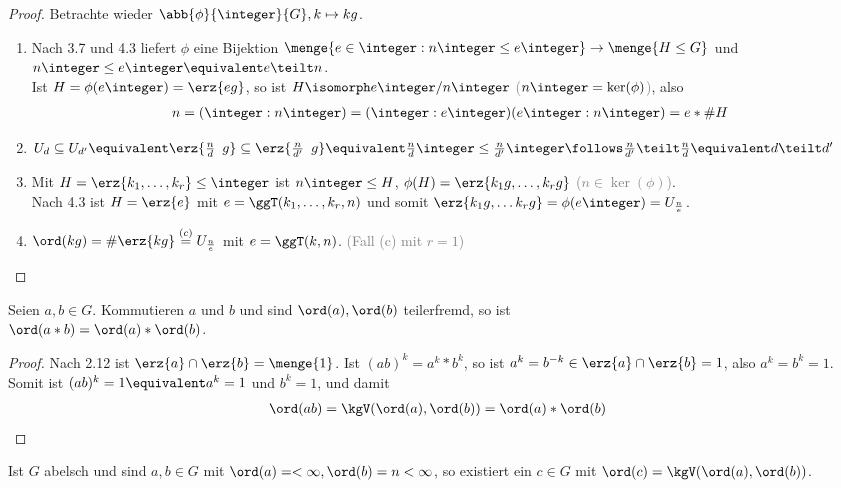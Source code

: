 \begin{proof}
	Betrachte wieder $\abb{\phi}{\integer}{G}, k \mapsto kg$.
	\begin{enumerate}
		\item Nach 3.7 und 4.3 liefert $\phi$ eine Bijektion $\menge{e \in \integer : n\integer \leq e\integer} \to \menge{H \leq G}$ und \\
		$n\integer \leq e\integer \equivalent e \teilt n$. \\
		Ist $H = \phi(e\integer) = \erz{eg}$, so ist $H \isomorph e\integer / n\integer$ \textcolor{gray}{($n\integer = \ker(\phi)$)}, also
		\begin{align*}
			n = (\integer : n \integer) = (\integer : e\integer) (e\integer : n \integer) = e * \# H
		\end{align*}
		\item $U_d \subseteq U_{d'} \equivalent \erz{\frac{n}{d} \enspace g} \subseteq \erz{\frac{n}{d'} \enspace g} \equivalent \frac{n}{d} \integer \leq \frac{n}{d'} \integer \follows \frac{n}{d'} \teilt \frac{n}{d} \equivalent d \teilt d'$
		\item Mit $H = \erz{k_1 , \dots , k_r} \leq \integer$ ist $n\integer \leq H$, $\phi(H) = \erz{k_1 g , \dots , k_r g}$ \textcolor{gray}{($n \in \ker(\phi)$)}. \\
		Nach 4.3 ist $H = \erz{e}$ mit $e = \ggT(k_1 , \dots , k_r , n)$ und somit $\erz{k_1 g , \dots k_r g} = \phi(e\integer) = U_{\frac{n}{e}}$.
		\item $\ord(kg) = \# \erz{kg} \overset{(c)}{=} U_{\frac{n}{e}}$ mit $e = \ggT(k,n)$. \textcolor{gray}{(Fall (c) mit $r=1$)}
	\end{enumerate}
\end{proof}
%
\begin{lemma}
	Seien $a,b \in G$. Kommutieren $a$ und $b$ und sind $\ord(a), \ord(b)$ teilerfremd, so ist \\
	$\ord(a*b) = \ord(a) * \ord(b)$.
\end{lemma}
\begin{proof}
	Nach 2.12 ist $\erz{a} \cap \erz{b} = \menge{1}$. Ist $(ab)^k = a^k * b^k$, so ist $a^k = b^{-k} \in \erz{a} \cap \erz{b} = 1$, also $a^k = b^k = 1$. Somit ist $(ab)^k = 1 \equivalent a^k = 1$ und $b^k = 1$, und damit
	\begin{align*}
		\ord(ab) = \kgV(\ord(a),\ord(b)) = \ord(a) * \ord(b)
	\end{align*}
\end{proof}
%
\begin{kor}
	Ist $G$ abelsch und sind $a,b \in G$ mit $\ord(a) = < \infty, \ord(b) = n < \infty$, so existiert ein $c \in G$ mit $\ord(c) = \kgV(\ord(a), \ord(b))$.
\end{kor}
